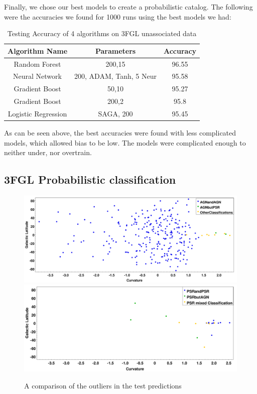  

Finally, we chose our best models to create a probabilistic catalog. The following were the accuracies we found for 1000 runs using the best models we had:\\



\begin{table}[!h]
    \tiny
    \centering
    \renewcommand{\tabcolsep}{1mm}
\renewcommand{\arraystretch}{1.5}

    \begin{tabular}{|c|c|c|}
    \hline
    Algorithm Name&Parameters & Accuracy\\
    \hline
    Random Forest& 200,15  & 96.55   \\
    \hline
    Neural Network & 200, ADAM, Tanh, 5 Neur     &  95.58 \\
    \hline %
    Gradient Boost& 50,10    &   95.27  \\
    \hline %
    Gradient Boost&200,2    &   95.8  \\
    \hline
    Logistic Regression& SAGA, 200 &95.45 \\
    \hline
     
    \end{tabular}

    \caption{Testing Accuracy of 4 algorithms on 3FGL unassociated data}
    \label{tab:my_labe2l}
\end{table}


As can be seen above, the best accuracies were found with less complicated models, which allowed bias to be low. The models were complicated enough to neither under, nor overtrain. \\

\subsection{3FGL Probabilistic classification} 

\begin{figure}[h]
\includegraphics[width=\twopicsp\textwidth]{plots/AGN.pdf}
\includegraphics[width=\twopicsp\textwidth]{plots/PSR3.pdf}
\caption{A comparison of the outliers in the test predictions}
\label{fig:Maps_data}
\end{figure}
